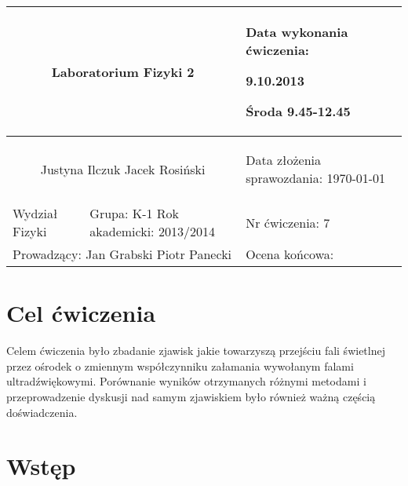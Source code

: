 \documentclass[a4paper,12pt]{article}
\author{Justyna Ilczuk, Jacek Rosiński}
\begin{document}
\begin{center}

    \begin{tabular}{ | m{5cm}| m{5cm} | m{5cm} |}
    \hline 
    \multicolumn{2}{|c|}{{ \Large \textbf{Laboratorium Fizyki 2}} }
    &  
    \begin{center}
    Data wykonania ćwiczenia:
    \end{center}
    \begin{center}
      9.10.2013 
    \end{center}
    \begin{center}
    Środa 9.45-12.45
    \end{center}
     \\ 
    
    \hline
    \multicolumn{2}{|c|}{Justyna Ilczuk \newline Jacek Rosiński}
    & \begin{center}
    {\small Data złożenia sprawozdania:} \newline \today
    \end{center}   \\
   	
   	\hline
    Wydział Fizyki & Grupa: K-1 \newline Rok akademicki: 2013/2014 &    Nr ćwiczenia: 7 \\
   	\hline
   	\multicolumn{2}{|l|}{Prowadzący: Jan Grabski Piotr Panecki} & \multicolumn{1}{|l|}{Ocena końcowa:}\\
    \hline
    \end{tabular}
\end{center}

\newpage

\pagestyle{fancy}
\fancyfoot[CO]{\ }
\fancyhead[RO]{\footnotesize{\thepage} }


\section{Cel ćwiczenia}

Celem ćwiczenia było zbadanie zjawisk jakie towarzyszą przejściu fali świetlnej przez ośrodek o zmiennym współczynniku załamania wywołanym falami ultradźwiękowymi. Porównanie wyników otrzymanych różnymi metodami i przeprowadzenie dyskusji nad samym zjawiskiem było również ważną częścią doświadczenia. 


\section{Wstęp}
\end{document}
